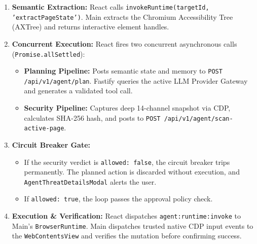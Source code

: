 \documentclass[11pt,a4paper]{article}
\begin{document}
\begin{enumerate}[leftmargin=1.4em]
\item \textbf{Semantic Extraction:} React calls \texttt{invokeRuntime(targetId, 'extractPageState')}. Main extracts the Chromium Accessibility Tree (AXTree) and returns interactive element handles.
\item \textbf{Concurrent Execution:} React fires two concurrent asynchronous calls (\texttt{Promise.allSettled}):
  \begin{itemize}
  \item \textbf{Planning Pipeline:} Posts semantic state and memory to \texttt{POST /api/v1/agent/plan}. Fastify queries the active LLM Provider Gateway and generates a validated tool call.
  \item \textbf{Security Pipeline:} Captures deep 14-channel snapshot via CDP, calculates SHA-256 hash, and posts to \texttt{POST /api/v1/agent/scan-active-page}.
  \end{itemize}
\item \textbf{Circuit Breaker Gate:}
  \begin{itemize}
  \item If the security verdict is \texttt{allowed: false}, the circuit breaker trips permanently. The planned action is discarded without execution, and \texttt{AgentThreatDetailsModal} alerts the user.
  \item If \texttt{allowed: true}, the loop passes the approval policy check.
  \end{itemize}
\item \textbf{Execution \& Verification:} React dispatches \texttt{agent:runtime:invoke} to Main's \texttt{BrowserRuntime}. Main dispatches trusted native CDP input events to the \texttt{WebContentsView} and verifies the mutation before confirming success.
\end{enumerate}
\end{document}
